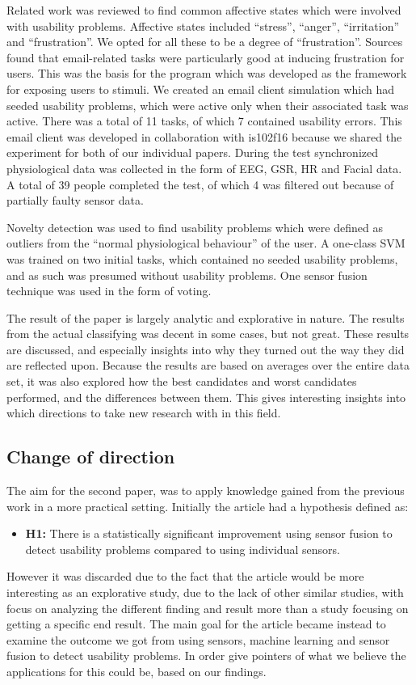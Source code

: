 Related work was reviewed to find common affective states which were involved with usability problems.
Affective states included ``stress'', ``anger'', ``irritation'' and ``frustration''.
We opted for all these to be a degree of ``frustration''.
Sources found that email-related tasks were particularly good at inducing frustration for users\cite{frustration_with_computers}.
This was the basis for the program which was developed as the framework for exposing users to stimuli. 
We created an email client simulation which had seeded usability problems, which were active only when their associated task was active.
There was a total of 11 tasks, of which 7 contained usability errors.
This email client was developed in collaboration with is102f16 because we shared the experiment for both of our individual papers.
During the test synchronized physiological data was collected in the form of EEG, GSR, HR and Facial data.
A total of 39 people completed the test, of which 4 was filtered out because of partially faulty sensor data.

Novelty detection was used to find usability problems which were defined as outliers from the ``normal physiological behaviour'' of the user. 
A one-class SVM was trained on two initial tasks, which contained no seeded usability problems, and as such was presumed without usability problems.
One sensor fusion technique was used in the form of voting. 

The result of the paper is largely analytic and explorative in nature.
The results from the actual classifying was decent in some cases, but not great.
These results are discussed, and especially insights into why they turned out the way they did are reflected upon.
Because the results are based on averages over the entire data set, it was also explored how the best candidates and worst candidates performed, and the differences between them.
This gives interesting insights into which directions to take new research with in this field.


\subsection{Change of direction}
The aim for the second paper, was to apply knowledge gained from the previous work in a more practical setting. 
Initially the article had a hypothesis defined as:
\begin{itemize}
    \item \textbf{H1:} There is a statistically significant improvement using sensor fusion to detect usability problems compared to using individual sensors.
\end{itemize}
However it was discarded due to the fact that the article would be more interesting as an explorative study, due to the lack of other similar studies, with focus on analyzing the different finding and result more than a study focusing on getting a specific end result.
The main goal for the article became instead to examine the outcome we got from using sensors, machine learning and sensor fusion to detect usability problems.
In order give pointers of what we believe the applications for this could be, based on our findings.

